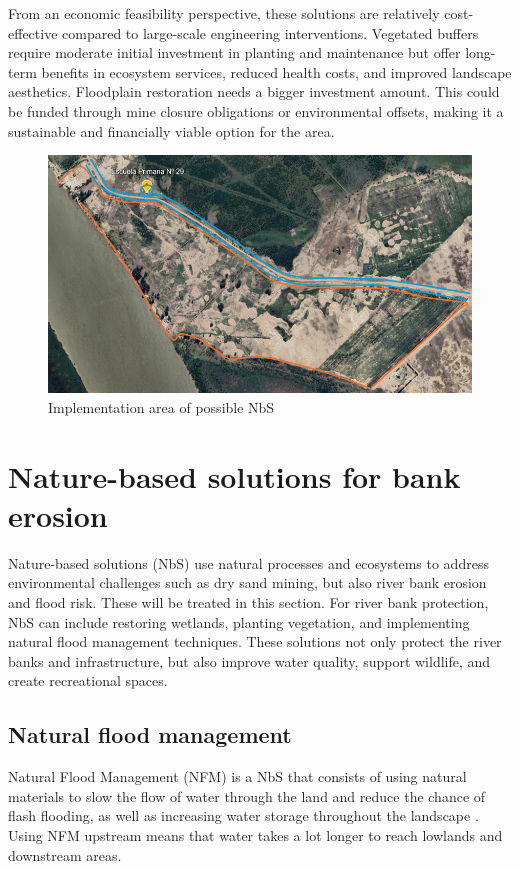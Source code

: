 From an economic feasibility perspective, these solutions are relatively cost-effective compared to large-scale engineering interventions. Vegetated buffers require moderate initial investment in planting and maintenance but offer long-term benefits in ecosystem services, reduced health costs, and improved landscape aesthetics. Floodplain restoration needs a bigger investment amount. This could be funded through mine closure obligations or environmental offsets, making it a sustainable and financially viable option for the area.


\begin{figure}[H]
    \centering
    \includegraphics[width=0.75\linewidth]{figures//ch8/omgevingschooltje2.png}
    \caption{Implementation area of possible NbS}
    \label{fig:PAI}
\end{figure}

\section{Nature-based solutions for bank erosion}
Nature-based solutions (NbS) use natural processes and ecosystems to address environmental challenges such as dry sand mining, but also river bank erosion and flood risk. These will be treated in this section. For river bank protection, NbS can include restoring wetlands, planting vegetation, and implementing natural flood management techniques. These solutions not only protect the river banks and infrastructure, but also improve water quality, support wildlife, and create recreational spaces.


\subsection{Natural flood management}
Natural Flood Management (NFM) is a NbS that consists of using natural materials to slow the flow of water through the land and reduce the chance of flash flooding, as well as increasing water storage throughout the landscape \autocite{therivertrust5EasyWays}. Using NFM upstream means that water takes a lot longer to reach lowlands and downstream areas. 

